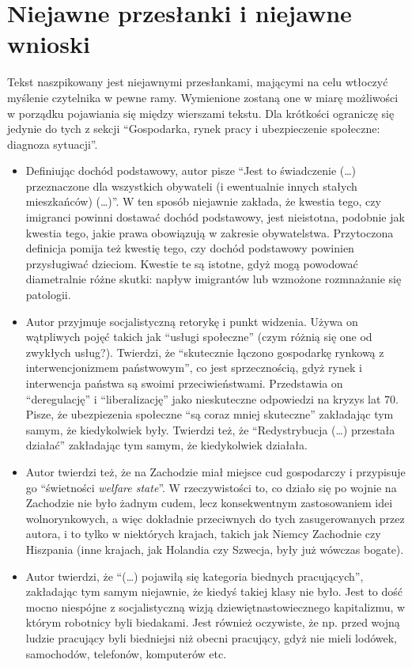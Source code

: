 \documentclass[11pt]{article}
\begin{document}
	\section{Niejawne przesłanki i niejawne wnioski}
		\par Tekst naszpikowany jest niejawnymi przesłankami, mającymi na celu wtłoczyć myślenie czytelnika w pewne ramy. Wymienione zostaną one w miarę możliwości w porządku pojawiania się między wierszami tekstu. Dla krótkości ograniczę się jedynie do tych z sekcji ``Gospodarka, rynek pracy i ubezpieczenie społeczne: diagnoza sytuacji''.
		\begin{itemize}
			\item Definiując dochód podstawowy, autor pisze ``Jest to świadczenie (\dots) przeznaczone dla wszystkich obywateli (i ewentualnie innych stałych mieszkańców) (\dots)''. W ten sposób niejawnie zakłada, że kwestia tego, czy imigranci powinni dostawać dochód podstawowy, jest nieistotna, podobnie jak kwestia tego, jakie prawa obowiązują w zakresie obywatelstwa. Przytoczona definicja pomija też kwestię tego, czy dochód podstawowy powinien przysługiwać dzieciom. Kwestie te są istotne, gdyż mogą powodować diametralnie różne skutki: napływ imigrantów lub wzmożone rozmnażanie się patologii.
			\item Autor przyjmuje socjalistyczną retorykę i punkt widzenia. Używa on wątpliwych pojęć takich jak ``usługi społeczne'' (czym różnią się one od zwykłych usług?). Twierdzi, że ``skutecznie łączono gospodarkę rynkową z interwencjonizmem państwowym'', co jest sprzecznością, gdyż rynek i interwencja państwa są swoimi przeciwieństwami. Przedstawia on ``deregulację'' i ``liberalizację'' jako nieskuteczne odpowiedzi na kryzys lat 70. Pisze, że ubezpiezenia społeczne ``są coraz mniej skuteczne'' zakładając tym samym, że kiedykolwiek były. Twierdzi też, że ``Redystrybucja (\dots) przestała działać'' zakładając tym samym, że kiedykolwiek działała.
			\item Autor twierdzi też, że na Zachodzie miał miejsce cud gospodarczy i przypisuje go ``świetności \textit{welfare state}''. W rzeczywistości to, co działo się po wojnie na Zachodzie nie było żadnym cudem, lecz konsekwentnym zastosowaniem idei wolnorynkowych, a więc dokładnie przeciwnych do tych zasugerowanych przez autora, i to tylko w niektórych krajach, takich jak Niemcy Zachodnie czy Hiszpania (inne krajach, jak Holandia czy Szwecja, były już wówczas bogate).
			\item Autor twierdzi, że ``(\dots) pojawiłą się kategoria biednych pracujących'', zakładając tym samym niejawnie, że kiedyś takiej klasy nie było. Jest to dość mocno niespójne z socjalistyczną wizją dziewiętnastowiecznego kapitalizmu, w którym robotnicy byli biedakami. Jest również oczywiste, że np. przed wojną ludzie pracujący byli biedniejsi niż obecni pracujący, gdyż nie mieli lodówek, samochodów, telefonów, komputerów etc.

\end{itemize}
\end{document}
